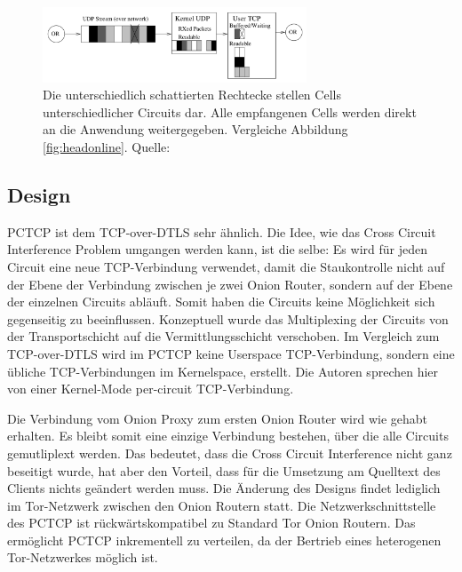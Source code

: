 \documentclass[fleqn,envcountsame,runningheads,10pt,a4paper]{llncs}
\begin{document}
\begin{figure}[h]
  \begin{center}
    \includegraphics[width=0.7\textwidth]{pics/headonlinedtls.pdf}
    \caption{Die unterschiedlich schattierten Rechtecke stellen Cells unterschiedlicher Circuits dar. Alle empfangenen Cells werden direkt an die Anwendung weitergegeben. Vergleiche Abbildung \ref{fig:headonline}. Quelle:\cite{tcp-over-dtls}}
    \label{fig:headonlinedtls} 
  \end{center} 
\end{figure} 

\subsection{Design}

PCTCP ist dem TCP-over-DTLS sehr ähnlich. Die Idee, wie das Cross Circuit 
Interference Problem umgangen werden kann, ist die selbe: Es wird für jeden 
Circuit eine neue TCP-Verbindung verwendet, damit die Staukontrolle nicht auf 
der Ebene der Verbindung zwischen je zwei Onion Router, sondern auf der Ebene 
der einzelnen Circuits abläuft. Somit haben die Circuits keine Möglichkeit sich 
gegenseitig zu beeinflussen. Konzeptuell wurde das Multiplexing der Circuits von 
der Transportschicht auf die Vermittlungsschicht verschoben. Im Vergleich zum 
TCP-over-DTLS wird im PCTCP keine Userspace TCP-Verbindung, sondern eine übliche 
TCP-Verbindungen im Kernelspace, erstellt. Die Autoren sprechen hier von einer 
Kernel-Mode per-circuit TCP-Verbindung. 

Die Verbindung vom Onion Proxy zum ersten Onion Router wird wie gehabt erhalten. 
Es bleibt somit eine einzige Verbindung bestehen, über die alle Circuits 
gemutliplext werden. Das bedeutet, dass die Cross Circuit Interference nicht 
ganz beseitigt wurde, hat aber den Vorteil, dass für die Umsetzung am Quelltext 
des Clients nichts geändert werden muss. Die Änderung des Designs findet 
lediglich im Tor-Netzwerk zwischen den Onion Routern statt. Die 
Netzwerkschnittstelle des PCTCP ist rückwärtskompatibel zu Standard Tor Onion 
Routern. Das ermöglicht PCTCP inkrementell zu verteilen, da der Bertrieb eines 
heterogenen Tor-Netzwerkes möglich ist.
\end{document}
